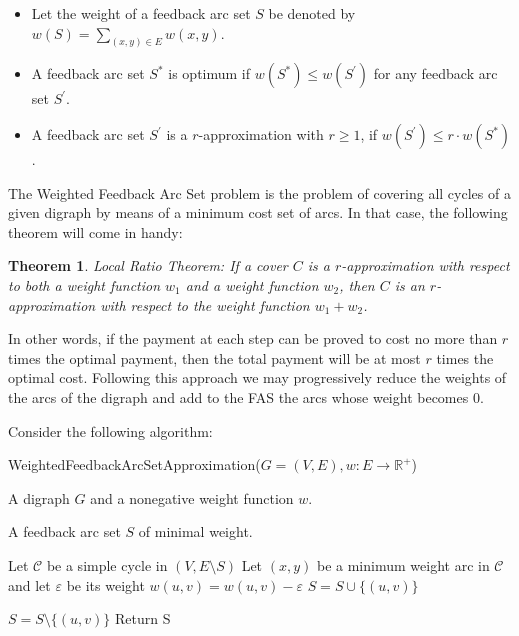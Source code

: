 \documentclass{article}
\newtheorem{theorem}{Theorem}
\begin{document}
\begin{itemize}
    \item Let the weight of a feedback arc set $S$ be denoted by $w(S) = \sum_{(x,y)\in E} w(x,y)$.
    \item A feedback arc set $S^*$ is optimum if $w(S^*) \leq w(S^\prime)$ for any feedback arc set $S^\prime$.
    \item A feedback arc set $S^\prime$ is a $r$-approximation with $r \geq 1$, if $w(S^\prime) \leq r\cdot w(S^*)$.
\end{itemize}

The Weighted Feedback Arc Set problem is the problem of covering all cycles of a given digraph by means of a minimum cost set of arcs. In that case, the following theorem will come in handy:

\begin{theorem}
    Local Ratio Theorem: If a cover $C$ is a $r$-approximation with respect to both a weight function $w_1$ and a weight function $w_2$, then $C$ is an $r$-approximation with respect to the weight function $w_1 + w_2$.
\end{theorem}

In other words, if the payment at each step can be proved to cost no more than $r$ times the optimal payment, then the total payment will be at most $r$ times the optimal cost. Following this approach we may progressively reduce the weights of the arcs of the digraph and add to the FAS the arcs whose weight becomes 0.

  \vspace{.5cm}
Consider the following algorithm:

 \begin{algorithm}[H]
  \caption*{{\sc WeightedFeedbackArcSetApproximation($G=(V,E), w: E\rightarrow \mathbb{R^+}$)}}
  \begin{algorithmic}[1]
\INPUT A digraph $G$ and a nonegative weight function $w$. 

\OUTPUT A feedback arc set $S$ of minimal weight.

 
\State Let $\mathcal{C}$ be a simple cycle in $(V,E\setminus S)$
\State Let $(x,y)$ be a minimum weight arc in $\mathcal{C}$ and let $\varepsilon$ be its weight
    \State $w(u,v) = w(u,v) - \varepsilon$
        \State $S = S \cup \{(u,v)\}$
    \EndIf
    \EndFor
\EndWhile

 
    \State $S = S\setminus \{(u,v)\}$
    \EndIf
\EndFor
\State Return S

\end{algorithmic}
\end{algorithm} 
\end{document}
